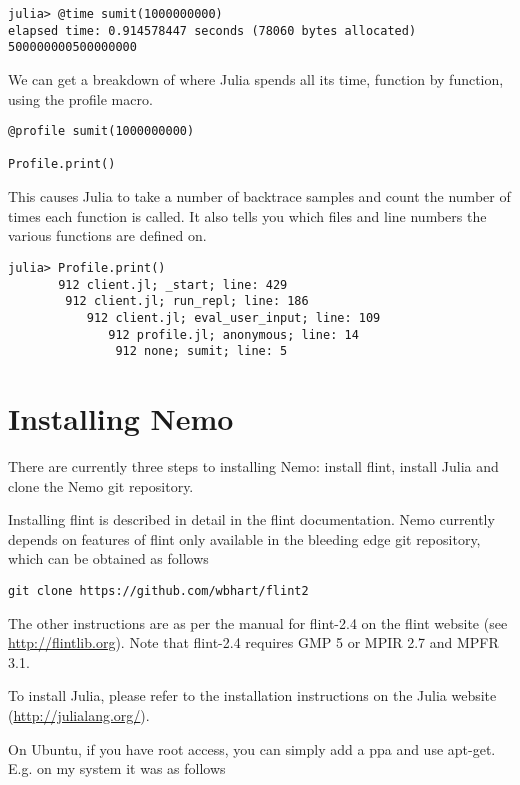 \documentclass[a4paper,10pt]{article}
\begin{document}
{\begin{verbatim}
julia> @time sumit(1000000000)
elapsed time: 0.914578447 seconds (78060 bytes allocated)
500000000500000000
\end{verbatim}

We can get a breakdown of where Julia spends all its time, function by function,
using the profile macro.

\begin{lstlisting}
@profile sumit(1000000000)

Profile.print()
\end{lstlisting}

This causes Julia to take a number of backtrace samples and count the number of times
each function is called. It also tells you which files and line numbers the various
functions are defined on.

\begin{verbatim}
julia> Profile.print()
       912 client.jl; _start; line: 429
        912 client.jl; run_repl; line: 186
           912 client.jl; eval_user_input; line: 109
              912 profile.jl; anonymous; line: 14
               912 none; sumit; line: 5
\end{verbatim}

\section{Installing Nemo}

There are currently three steps to installing Nemo: install flint, install Julia and
clone the Nemo git repository.

Installing flint is described in detail in the flint documentation. Nemo currently
depends on features of flint only available in the bleeding edge git repository,
which can be obtained as follows

\begin{verbatim}
git clone https://github.com/wbhart/flint2
\end{verbatim}

The other instructions are as per the manual for flint-2.4 on the flint website (see
\url{http://flintlib.org}). Note that flint-2.4 requires GMP 5 or MPIR 2.7 and MPFR
3.1.

To install Julia, please refer to the installation instructions on the Julia website
(\url{http://julialang.org/}).

On Ubuntu, if you have root access, you can simply add a ppa and use apt-get. E.g. on
my system it was as follows

}
\end{document}
